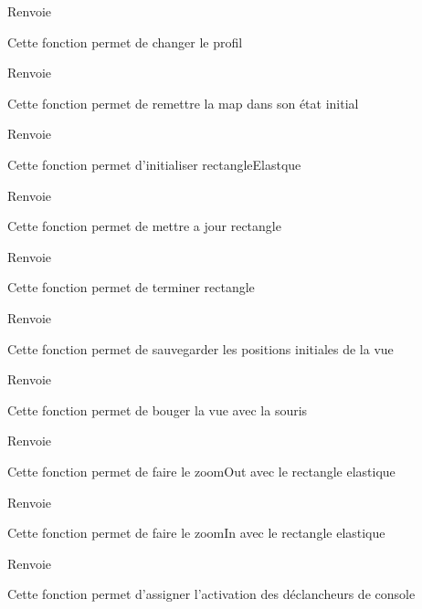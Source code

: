 \begin{DoxyReturn}{Renvoie}

\end{DoxyReturn}
Cette fonction permet de changer le profil

\begin{DoxyReturn}{Renvoie}

\end{DoxyReturn}
Cette fonction permet de remettre la map dans son état initial

\begin{DoxyReturn}{Renvoie}

\end{DoxyReturn}
Cette fonction permet d'initialiser rectangle\-Elastque

\begin{DoxyReturn}{Renvoie}

\end{DoxyReturn}
Cette fonction permet de mettre a jour rectangle

\begin{DoxyReturn}{Renvoie}

\end{DoxyReturn}
Cette fonction permet de terminer rectangle

\begin{DoxyReturn}{Renvoie}

\end{DoxyReturn}
Cette fonction permet de sauvegarder les positions initiales de la vue

\begin{DoxyReturn}{Renvoie}

\end{DoxyReturn}
Cette fonction permet de bouger la vue avec la souris

\begin{DoxyReturn}{Renvoie}

\end{DoxyReturn}
Cette fonction permet de faire le zoom\-Out avec le rectangle elastique

\begin{DoxyReturn}{Renvoie}

\end{DoxyReturn}
Cette fonction permet de faire le zoom\-In avec le rectangle elastique

\begin{DoxyReturn}{Renvoie}

\end{DoxyReturn}
Cette fonction permet d'assigner l'activation des déclancheurs de console

